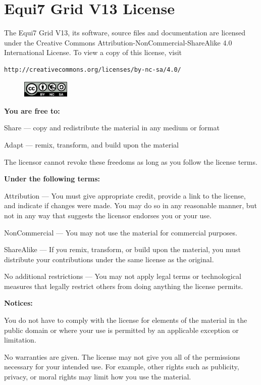 \documentclass[11pt,a4paper]{article}
\begin{document}
\section*{Equi7 Grid V13 License}

The Equi7 Grid V13, its software, source files and documentation are licensed under the Creative Commons Attribution-NonCommercial-ShareAlike 4.0 International License. To view a copy of this license, visit

\begin{lstlisting}
http://creativecommons.org/licenses/by-nc-sa/4.0/
\end{lstlisting}

\begin{figure}[hbtp]
\centering
\includegraphics[width=0.2\textwidth]{cc_by-nc-sa}
\end{figure}

\textbf{You are free to:}

Share — copy and redistribute the material in any medium or format

Adapt — remix, transform, and build upon the material

The licensor cannot revoke these freedoms as long as you follow the license terms.

\textbf{Under the following terms:}

Attribution — You must give appropriate credit, provide a link to the license, and indicate if changes were made. You may do so in any reasonable manner, but not in any way that suggests the licensor endorses you or your use.

NonCommercial — You may not use the material for commercial purposes.

ShareAlike — If you remix, transform, or build upon the material, you must distribute your contributions under the same license as the original.

No additional restrictions — You may not apply legal terms or technological measures that legally restrict others from doing anything the license permits.

\textbf{Notices:}

You do not have to comply with the license for elements of the material in the public domain or where your use is permitted by an applicable exception or limitation.

No warranties are given. The license may not give you all of the permissions necessary for your intended use. For example, other rights such as publicity, privacy, or moral rights may limit how you use the material.
\end{document}
